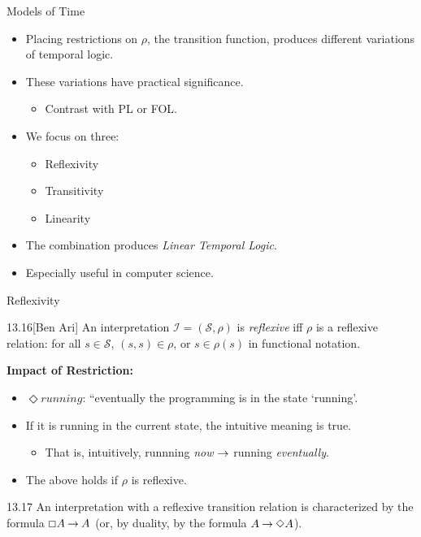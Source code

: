 \begin{wideslide}[bm=,toc=]{Models of Time}
\begin{itemize}
\item Placing restrictions on $\rho$, the transition function, produces
different variations of temporal logic.
\item These variations have practical significance.
\begin{itemize}
\item Contrast with PL or FOL.
\end{itemize}
\item We focus on three:
\begin{itemize}
\item Reflexivity
\item Transitivity
\item Linearity
\end{itemize}
\item The combination produces \emph{Linear Temporal Logic}.
\item Especially useful in computer science.
\end{itemize}
\end{wideslide}


\begin{wideslide}[bm=,toc=]{Reflexivity}
\begin{defn}{13.16}[Ben Ari]
An interpretation $\mathcal{I} = (\mathcal{S},\rho)$ is \emph{reflexive}
iff $\rho$ is a reflexive relation: for all $s \in \mathcal{S}$, $(s,s) \in
\rho$, or $s \in \rho(s)$ in functional notation.
\end{defn}
{\bf Impact of Restriction:}
\begin{itemize}
\item $\Diamond running$: ``eventually the programming is in the state
`running'.
\item If it is running in the current state, the intuitive meaning is true.
\begin{itemize}
\item That is, intuitively, runnning \emph{now} $\mathbin{\rightarrow}$ running \emph{eventually}.
\end{itemize}
\item The above holds if $\rho$ is reflexive.
\end{itemize}
\begin{thm}{13.17}
An interpretation with a reflexive transition relation is characterized by the
formula $\Box A \mathbin{\rightarrow} A$ (or, by duality, by the formula $A \mathbin{\rightarrow} \Diamond A$).
\end{thm}
\end{wideslide}

